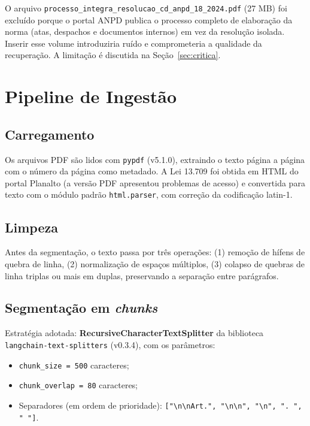 \documentclass[
  12pt,
  a4paper,
  brazil,
  article,
  oneside,
  sumario=tradicional
]{abntex2}
\begin{document}
O arquivo \texttt{processo\_integra\_resolucao\_cd\_anpd\_18\_2024.pdf} (27 MB) foi
excluído porque o portal ANPD publica o processo completo de elaboração da norma
(atas, despachos e documentos internos) em vez da resolução isolada. Inserir esse
volume introduziria ruído e comprometeria a qualidade da recuperação. A
limitação é discutida na Seção~\ref{sec:critica}.

\section{Pipeline de Ingestão}

\subsection{Carregamento}

Os arquivos PDF são lidos com \texttt{pypdf} (v5.1.0), extraindo o texto página a
página com o número da página como metadado. A Lei 13.709 foi obtida em HTML do portal
Planalto (a versão PDF apresentou problemas de acesso) e convertida para texto com o
módulo padrão \texttt{html.parser}, com correção da codificação latin-1.

\subsection{Limpeza}

Antes da segmentação, o texto passa por três operações: (1) remoção de hífens de
quebra de linha, (2) normalização de espaços múltiplos, (3) colapso de quebras de
linha triplas ou mais em duplas, preservando a separação entre parágrafos.

\subsection{Segmentação em \textit{chunks}}

Estratégia adotada: \textbf{RecursiveCharacterTextSplitter} da biblioteca
\texttt{langchain-text-splitters} (v0.3.4), com os parâmetros:

\begin{itemize}[leftmargin=*]
  \item \texttt{chunk\_size = 500} caracteres;
  \item \texttt{chunk\_overlap = 80} caracteres;
  \item Separadores (em ordem de prioridade):
        \texttt{["\textbackslash{}n\textbackslash{}nArt.",
                 "\textbackslash{}n\textbackslash{}n",
                 "\textbackslash{}n", ". ", " "]}.
\end{itemize}
\end{document}
